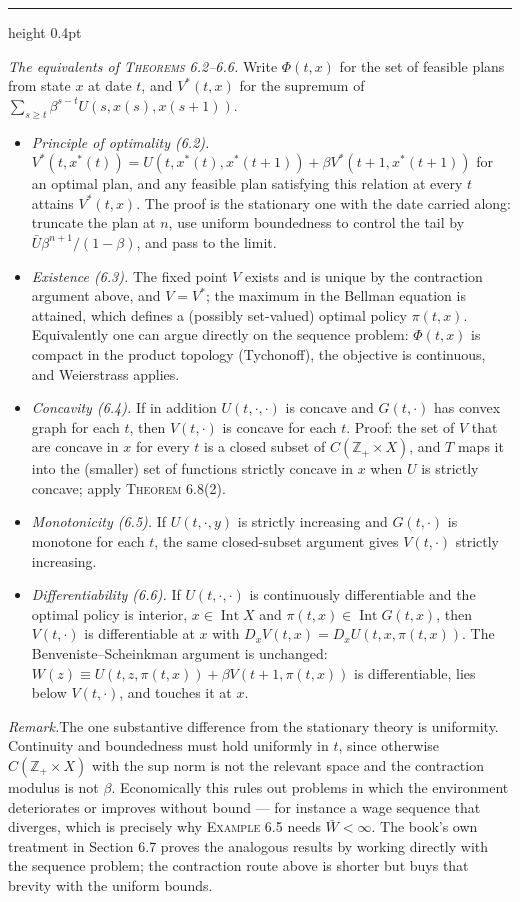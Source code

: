 \documentclass[11pt,letterpaper,reqno]{amsart}
\makeatletter
\newcommand{\Z}{\mathbb{Z}}
\newcommand{\as@head}[3]{%
  \par\addvspace{1.6ex}\penalty-200\relax
  \phantomsection
  \addcontentsline{toc}{subsection}{#1 #2\texorpdfstring{\ifx\relax#3\relax\else\quad #3\fi}{}}%
  {\color{RuleGrey}\hrule height 0.4pt}%
  \nobreak\vspace{0.8ex}\nobreak
  \noindent{\bfseries #1 #2}%
  \ifx\relax#3\relax\else\quad{\bfseries\itshape #3}\fi
  \par\nobreak\vspace{0.4ex}\nobreak
  \as@beginstatement
}
\newcommand{\as@beginstatement}{\begingroup\itshape\ignorespaces}
\newenvironment{aex}[2]{\as@head{Exercise}{#1}{#2}}{\par\addvspace{1.2ex}}
\newcommand{\rmk}[1]{%
  \par\vspace{0.6ex}%
  {\small\noindent\textit{Remark.}\hspace{0.5em}#1\par}%
  \vspace{0.4ex}%
}
\newcommand{\bk}[1]{\textup{\textsc{#1}}}
\renewcommand{\as@beginstatement}{\ignorespaces}
\makeatother
\begin{document}
\begin{aex}{6.14}{}
\emph{The equivalents of \bk{Theorems 6.2--6.6}.}  Write $\Phi(t,x)$ for the set of feasible plans from
state $x$ at date $t$, and $V^*(t,x)$ for the supremum of $\sum_{s\ge t}\beta^{s-t}U(s,x(s),x(s+1))$.
\begin{itemize}
\item \emph{Principle of optimality (6.2).}  $V^*(t,x^*(t))=U(t,x^*(t),x^*(t+1))+\beta V^*(t+1,x^*(t+1))$
      for an optimal plan, and any feasible plan satisfying this relation at every $t$ attains
      $V^*(t,x)$.  The proof is the stationary one with the date carried along: truncate the plan at $n$,
      use uniform boundedness to control the tail by $\bar U\beta^{n+1}/(1-\beta)$, and pass to the limit.
\item \emph{Existence (6.3).}  The fixed point $V$ exists and is unique by the contraction argument above,
      and $V=V^*$; the maximum in the Bellman equation is attained, which defines a (possibly
      set-valued) optimal policy $\pi(t,x)$.  Equivalently one can argue directly on the sequence problem:
      $\Phi(t,x)$ is compact in the product topology (Tychonoff), the objective is continuous, and
      Weierstrass applies.
\item \emph{Concavity (6.4).}  If in addition $U(t,\cdot,\cdot)$ is concave and $G(t,\cdot)$ has convex
      graph for each $t$, then $V(t,\cdot)$ is concave for each $t$.  Proof: the set of $V$ that are
      concave in $x$ for every $t$ is a closed subset of $C(\Z_+\times X)$, and $T$ maps it into the
      (smaller) set of functions strictly concave in $x$ when $U$ is strictly concave; apply
      \bk{Theorem 6.8}(2).
\item \emph{Monotonicity (6.5).}  If $U(t,\cdot,y)$ is strictly increasing and $G(t,\cdot)$ is monotone for
      each $t$, the same closed-subset argument gives $V(t,\cdot)$ strictly increasing.
\item \emph{Differentiability (6.6).}  If $U(t,\cdot,\cdot)$ is continuously differentiable and the optimal
      policy is interior, $x\in\operatorname{Int}X$ and $\pi(t,x)\in\operatorname{Int}G(t,x)$, then
      $V(t,\cdot)$ is differentiable at $x$ with $D_xV(t,x)=D_xU(t,x,\pi(t,x))$.  The Benveniste--Scheinkman
      argument is unchanged: $W(z)\equiv U(t,z,\pi(t,x))+\beta V(t+1,\pi(t,x))$ is differentiable, lies
      below $V(t,\cdot)$, and touches it at $x$.
\end{itemize}

\rmk{The one substantive difference from the stationary theory is uniformity.  Continuity and boundedness
must hold uniformly in $t$, since otherwise $C(\Z_+\times X)$ with the sup norm is not the relevant space
and the contraction modulus is not $\beta$.  Economically this rules out problems in which the environment
deteriorates or improves without bound --- for instance a wage sequence that diverges, which is precisely
why \bk{Example 6.5} needs $\bar W<\infty$.  The book's own treatment in Section 6.7 proves the analogous
results by working directly with the sequence problem; the contraction route above is shorter but buys that
brevity with the uniform bounds.}
\end{aex}
\end{document}
